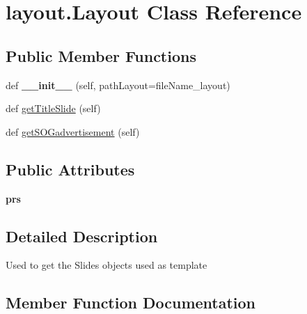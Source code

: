 \hypertarget{classlayout_1_1Layout}{}\section{layout.\+Layout Class Reference}
\label{classlayout_1_1Layout}
\subsection*{Public Member Functions}
\begin{DoxyCompactItemize}
\item 
\mbox{\label{classlayout_1_1Layout_a7db96bc878fd1f07250baca76551d335}} 
def {\bfseries \+\_\+\+\_\+init\+\_\+\+\_\+} (self, path\+Layout=file\+Name\+\_\+layout)
\item 
def \mbox{\hyperlink{classlayout_1_1Layout_a863963cd203ccb0d31fef73dc598f138}{get\+Title\+Slide}} (self)
\item 
def \mbox{\hyperlink{classlayout_1_1Layout_a3f7cfd8b7c1f699089e983e03398be91}{get\+S\+O\+Gadvertisement}} (self)
\end{DoxyCompactItemize}
\subsection*{Public Attributes}
\begin{DoxyCompactItemize}
\item 
\mbox{\label{classlayout_1_1Layout_a798df89eacff80ee8fe674b32f3b2820}} 
{\bfseries prs}
\end{DoxyCompactItemize}


\subsection{Detailed Description}
\begin{DoxyVerb}Used to get the Slides objects used as template
\end{DoxyVerb}
 

\subsection{Member Function Documentation}
\mbox{\label{classlayout_1_1Layout_a3f7cfd8b7c1f699089e983e03398be91}} 
